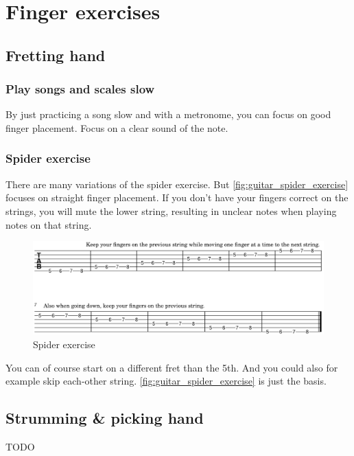\chapter{Finger exercises} \label{chap:finger_exercises}

\section{Fretting hand}

\subsection{Play songs and scales slow}

By just practicing a song slow and with a metronome, you can focus on good finger placement. Focus on a clear sound of the note.

\subsection{Spider exercise}

There are many variations of the spider exercise. But \autoref{fig:guitar_spider_exercise} focuses on straight finger placement. If you don't have your fingers correct on the strings, you will mute the lower string, resulting in unclear notes when playing notes on that string.

\begin{figure}[h]
	\centering
	\includegraphics[width=\textwidth]{../../MuseScore/Guitar/guitar_basic_spider_exercise.png}
	\caption{Spider exercise}
	\label{fig:guitar_spider_exercise}
\end{figure}

You can of course start on a different fret than the 5th. And you could also for example skip each-other string. \autoref{fig:guitar_spider_exercise} is just the basis.

\section{Strumming \& picking hand}
TODO